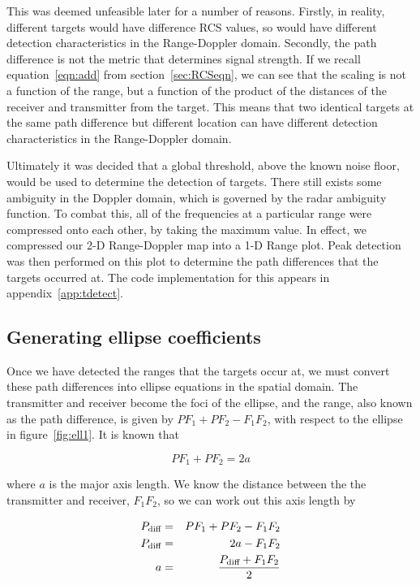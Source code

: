 \documentclass[12pt,openany,a4paper]{book}
\begin{document}
\bigskip

This was deemed unfeasible later for a number of reasons. Firstly, in reality, different targets would have difference RCS values, so would have different detection characteristics in the Range-Doppler domain. Secondly, the path difference is not the metric that determines signal strength. If we recall equation~\ref{eqn:add} from section~\ref{sec:RCSeqn}, we can see that the scaling is not a function of the range, but a function of the product of the distances of the receiver and transmitter from the target. This means that two identical targets at the same path difference but different location can have different detection characteristics in the Range-Doppler domain.

\bigskip

Ultimately it was decided that a global threshold, above the known noise floor, would be used to determine the detection of targets. There still exists some ambiguity in the Doppler domain, which is governed by the radar ambiguity function. To combat this, all of the frequencies at a particular range were compressed onto each other, by taking the maximum value. In effect, we compressed our 2-D Range-Doppler map into a 1-D Range plot. Peak detection was then performed on this plot to determine the path differences that the targets occurred at. The code implementation for this appears in appendix~\ref{app:tdetect}.

\subsection{Generating ellipse coefficients}
\label{sec:ell1}
Once we have detected the ranges that the targets occur at, we must convert these path differences into ellipse equations in the spatial domain. The transmitter and receiver become the foci of the ellipse, and the range, also known as the path difference, is given by $PF_1 + PF_2 - F_1F_2$, with respect to the ellipse in figure~\ref{fig:ell1}. It is known that

\begin{equation}
PF_1 + PF_2 = 2a
\end{equation}

\bigskip

where $a$ is the major axis length. We know the distance between the the transmitter and receiver, $F_1F_2$, so we can work out this axis length by

\begin{eqnarray}
P_{\textnormal{diff}} &=& PF_1 + PF_2 - F_1F_2 \\
P_{\textnormal{diff}} &=& 2a - F_1F_2 \\
a &=& \frac{P_{\textnormal{diff}} + F_1F_2}{2}
\end{eqnarray}
\end{document}
